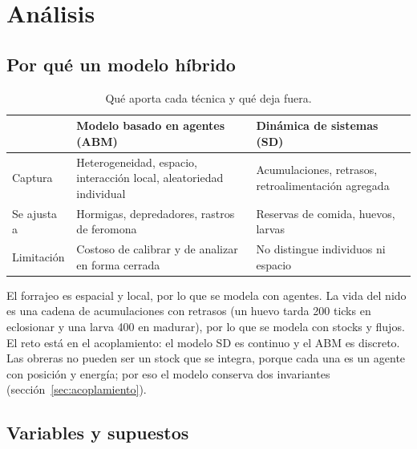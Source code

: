 \documentclass[11pt,a4paper]{article}
\begin{document}
\section{Análisis}

\subsection{Por qué un modelo híbrido}

\begin{table}[H]
\centering
\caption{Qué aporta cada técnica y qué deja fuera.}
\label{tab:tecnicas}
\begin{tabularx}{\textwidth}{@{}lXX@{}}
\toprule
 & \textbf{Modelo basado en agentes (ABM)} & \textbf{Dinámica de sistemas (SD)} \\
\midrule
Captura & Heterogeneidad, espacio, interacción local, aleatoriedad individual & Acumulaciones, retrasos, retroalimentación agregada \\
Se ajusta a & Hormigas, depredadores, rastros de feromona & Reservas de comida, huevos, larvas \\
Limitación & Costoso de calibrar y de analizar en forma cerrada & No distingue individuos ni espacio \\
\bottomrule
\end{tabularx}
\end{table}

El forrajeo es espacial y local, por lo que se modela con agentes. La vida del nido es una cadena de acumulaciones con retrasos (un huevo tarda 200 ticks en eclosionar y una larva 400 en madurar), por lo que se modela con stocks y flujos. El reto está en el acoplamiento: el modelo SD es continuo y el ABM es discreto. Las obreras no pueden ser un stock que se integra, porque cada una es un agente con posición y energía; por eso el modelo conserva dos invariantes (sección~\ref{sec:acoplamiento}).

\subsection{Variables y supuestos}
\end{document}
